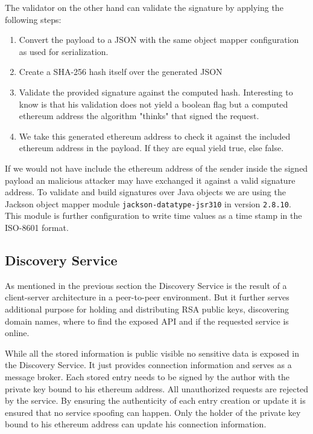 \noindent The validator on the other hand can validate the signature by applying the following steps:

\begin{enumerate}
\item Convert the payload to a JSON with the same object mapper configuration as used for serialization.
\item Create a SHA-256 hash itself over the generated JSON
\item Validate the provided signature against the computed hash. Interesting to know is that his validation does not yield a boolean flag but a computed ethereum address the algorithm "thinks" that signed the request. 
\item We take this generated ethereum address to check it against the included ethereum address in the payload. If they are equal yield true, else false. 
\end{enumerate}

If we would not have include the ethereum address of the sender inside the signed payload an malicious attacker may have exchanged it against a valid signature address. 
To validate and build signatures over Java objects we are using the Jackson object mapper module \lstinline{jackson-datatype-jsr310} in version \lstinline{2.8.10}. This module is further configuration to write time values as a time stamp in the ISO-8601 format. 

\subsection{Discovery Service}
\label{sec:discoveryService}
As mentioned in the previous section the Discovery Service is the result of a client-server architecture in a peer-to-peer environment. But it further serves additional purpose for holding and distributing RSA public keys, discovering domain names, where to find the exposed API and if the requested service is online. 

While all the stored information is public visible no sensitive data is exposed in the Discovery Service. It just provides connection information and serves as a message broker. Each stored entry needs to be signed by the author with the private key bound to his ethereum address. All unauthorized requests are rejected by the service. By ensuring the authenticity of each entry creation or update it is ensured that no service spoofing can happen. Only the holder of the private key bound to his ethereum address can update his connection information.

